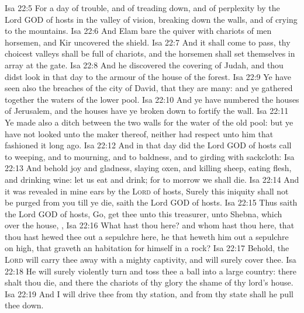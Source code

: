 \vs Isa 22:5 For  a day of trouble, and of treading down, and of perplexity by the Lord GOD of hosts in the valley of vision, breaking down the walls, and of crying to the mountains.
\vs Isa 22:6 And Elam bare the quiver with chariots of men  horsemen, and Kir uncovered the shield.
\vs Isa 22:7 And it shall come to pass,  thy choicest valleys shall be full of chariots, and the horsemen shall set themselves in array at the gate.
\vs Isa 22:8 And he discovered the covering of Judah, and thou didst look in that day to the armour of the house of the forest.
\vs Isa 22:9 Ye have seen also the breaches of the city of David, that they are many: and ye gathered together the waters of the lower pool.
\vs Isa 22:10 And ye have numbered the houses of Jerusalem, and the houses have ye broken down to fortify the wall.
\vs Isa 22:11 Ye made also a ditch between the two walls for the water of the old pool: but ye have not looked unto the maker thereof, neither had respect unto him that fashioned it long ago.
\vs Isa 22:12 And in that day did the Lord GOD of hosts call to weeping, and to mourning, and to baldness, and to girding with sackcloth:
\vs Isa 22:13 And behold joy and gladness, slaying oxen, and killing sheep, eating flesh, and drinking wine: let us eat and drink; for to morrow we shall die.
\vs Isa 22:14 And it was revealed in mine ears by the \textsc{Lord} of hosts, Surely this iniquity shall not be purged from you till ye die, saith the Lord GOD of hosts.
\vs Isa 22:15 Thus saith the Lord GOD of hosts, Go, get thee unto this treasurer,  unto Shebna, which  over the house, ,
\vs Isa 22:16 What hast thou here? and whom hast thou here, that thou hast hewed thee out a sepulchre here,  he that heweth him out a sepulchre on high,  that graveth an habitation for himself in a rock?
\vs Isa 22:17 Behold, the \textsc{Lord} will carry thee away with a mighty captivity, and will surely cover thee.
\vs Isa 22:18 He will surely violently turn and toss thee  a ball into a large country: there shalt thou die, and there the chariots of thy glory  the shame of thy lord's house.
\vs Isa 22:19 And I will drive thee from thy station, and from thy state shall he pull thee down.
